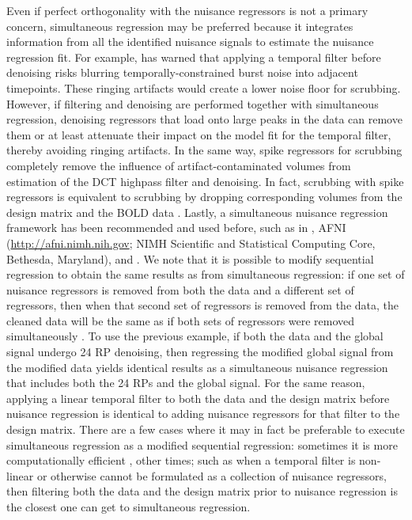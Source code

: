 \documentclass{article}
\begin{document}
Even if perfect orthogonality with the nuisance regressors is not a primary concern, simultaneous regression may be preferred because it integrates information from all the identified nuisance signals to estimate the nuisance regression fit. For example, \cite{carpOptimizingOrderOperations2013} has warned that applying a temporal filter before denoising risks blurring temporally-constrained burst noise into adjacent timepoints. These ringing artifacts would create a lower noise floor for scrubbing. However, if filtering and denoising are performed together with simultaneous regression, denoising regressors that load onto large peaks in the data can remove them or at least attenuate their impact on the model fit for the temporal filter, thereby avoiding ringing artifacts. In the same way, spike regressors for scrubbing completely remove the influence of artifact-contaminated volumes from estimation of the DCT highpass filter and denoising. In fact, scrubbing with spike regressors is equivalent to scrubbing by dropping corresponding volumes from the design matrix and the BOLD data \citep{power2015recent}.
Lastly, a simultaneous nuisance regression framework has been recommended and used before, such as in \cite{caballero-gaudesMethodsCleaningBOLD2017}, AFNI (\url{http://afni.nimh.nih.gov}; NIMH Scientific and Statistical Computing Core, Bethesda, Maryland), and \cite{parkesEvaluationEfficacyReliability2018}. We note that it is possible to modify sequential regression to obtain the same results as from simultaneous regression: if one set of nuisance regressors is removed from both the data and a different set of regressors, then when that second set of regressors is removed from the data, the cleaned data will be the same as if both sets of regressors were removed simultaneously \citep{lindquistModularPreprocessingPipelines2019}. To use the previous example, if both the data and the global signal undergo 24 RP denoising, then regressing the modified global signal from the modified data yields identical results as a simultaneous nuisance regression that includes both the 24 RPs and the global signal. For the same reason, applying a linear temporal filter to both the data and the design matrix before nuisance regression is identical to adding nuisance regressors for that filter to the design matrix. There are a few cases where it may in fact be preferable to execute simultaneous regression as a modified sequential regression: sometimes it is more computationally efficient \citep{power2015recent}, other times; such as when a temporal filter is non-linear or otherwise cannot be formulated as a collection of nuisance regressors, then filtering both the data and the design matrix prior to nuisance regression is the closest one can get to simultaneous regression. 
\end{document}
